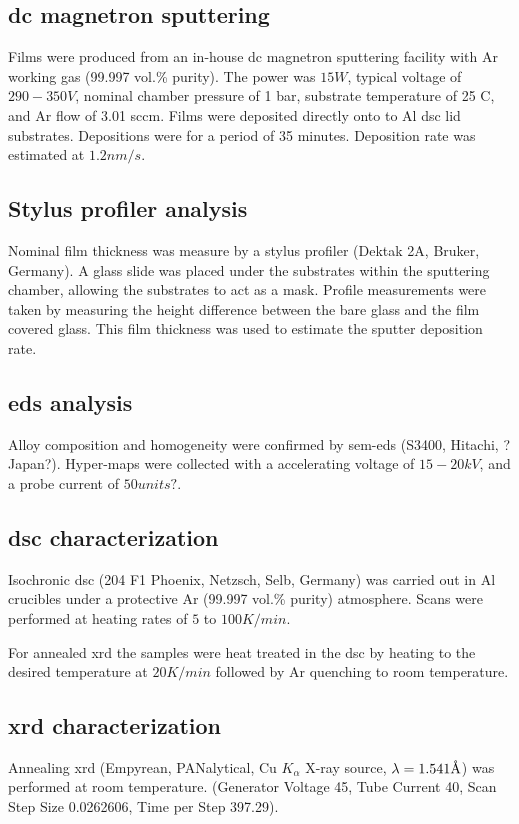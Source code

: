 \documentclass[a4paper,12pt,oneside]{article}%
\begin{document}
\subsection{\acrshort{dc} magnetron sputtering}
Films were produced from an in-house \acrshort{dc} magnetron sputtering facility with Ar working gas (99.997 vol.\% purity). The power was $15W$, typical voltage of $290-350V$, nominal chamber pressure of 1 bar, substrate temperature of 25 \degree C, and Ar flow of 3.01 \acrshort{sccm}. Films were deposited directly onto to Al \acrshort{dsc} lid substrates. Depositions were for a period of 35 minutes. Deposition rate was estimated at $1.2 nm/s$. 

\subsection{Stylus profiler analysis}
Nominal film thickness was measure by a stylus profiler (Dektak 2A, Bruker, Germany). A glass slide was placed under the substrates within the sputtering chamber, allowing the substrates to act as a mask. Profile measurements were taken by measuring the height difference between the bare glass and the film covered glass. This film thickness was used to estimate the sputter deposition rate.  

\subsection{\acrshort{eds} analysis}
Alloy composition and homogeneity were confirmed by \acrshort{sem}-\acrshort{eds} (S3400, Hitachi, ?Japan?). Hyper-maps were collected with a accelerating voltage of $15-20kV$, and a probe current of $50units?$. 

\subsection{\acrshort{dsc} characterization}
Isochronic \acrshort{dsc} (204 F1 Phoenix, Netzsch, Selb, Germany) was carried out in Al crucibles under a protective Ar (99.997 vol.\% purity) atmosphere. Scans were performed at heating rates of $5$ to $100 K/min$. 

For annealed \acrshort{xrd} the samples were heat treated in the \acrshort{dsc} by heating to the desired temperature at $20 K/min$ followed by Ar quenching to room temperature.

\subsection{\acrshort{xrd} characterization}
Annealing \acrshort{xrd} (Empyrean, PANalytical, Cu $K_{\alpha}$ X-ray source, $\lambda = 1.541 \mbox{\normalfont\AA}$) was performed at room temperature. 
(Generator Voltage 45, Tube Current 40, Scan Step Size 0.0262606, Time per Step 397.29). 
\end{document}
